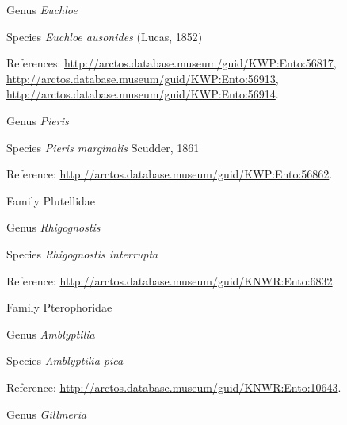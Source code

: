 \documentclass[9pt, article]{memoir}
\begin{document}
\begin{multicols}{2}
\vspace{6pt}\noindent\hspace{30pt}Genus \textit{Euchloe}


\vspace{6pt}\noindent\hspace{36pt}Species \textit{Euchloe ausonides} (Lucas, 1852)


References: 
\url{http://arctos.database.museum/guid/KWP:Ento:56817}, 
\url{http://arctos.database.museum/guid/KWP:Ento:56913}, 
\url{http://arctos.database.museum/guid/KWP:Ento:56914}.

\vspace{6pt}\noindent\hspace{30pt}Genus \textit{Pieris}


\vspace{6pt}\noindent\hspace{36pt}Species \textit{Pieris marginalis} Scudder, 1861


Reference: 
\url{http://arctos.database.museum/guid/KWP:Ento:56862}.

\vspace{6pt}\noindent\hspace{24pt}Family Plutellidae


\vspace{6pt}\noindent\hspace{30pt}Genus \textit{Rhigognostis}


\vspace{6pt}\noindent\hspace{36pt}Species \textit{Rhigognostis interrupta}


Reference: 
\url{http://arctos.database.museum/guid/KNWR:Ento:6832}.

\vspace{6pt}\noindent\hspace{24pt}Family Pterophoridae


\vspace{6pt}\noindent\hspace{30pt}Genus \textit{Amblyptilia}


\vspace{6pt}\noindent\hspace{36pt}Species \textit{Amblyptilia pica}


Reference: 
\url{http://arctos.database.museum/guid/KNWR:Ento:10643}.

\vspace{6pt}\noindent\hspace{30pt}Genus \textit{Gillmeria}



\end{multicols}
\end{document}

